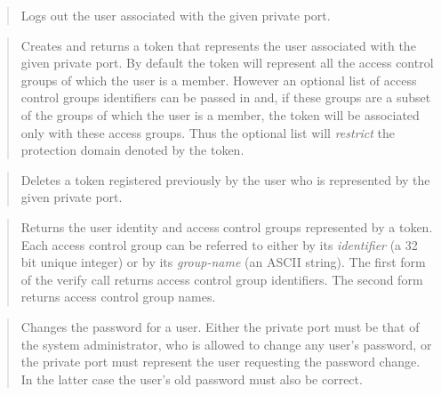 \begin{quotation} 

Logs out the user associated with the given private port.
\end{quotation}

\begin{quotation} 

Creates and returns a token that represents the user associated with the
given private port.  By default the token will represent all the access
control groups of which the user is a member.  However an optional list of
access control groups identifiers can be passed in and, if these groups are
a subset of the groups of which the user is a member, the token will be
associated only with these access groups.  Thus the optional list will {\em
restrict\/} the protection domain denoted by the token.
\end{quotation}

\begin{quotation} 

Deletes a token registered previously by the user who is represented by the
given private port.
\end{quotation}

\begin{quotation} 


Returns the user identity and access control groups represented by a token.
Each access control group can be referred to either by its {\em identifier\/}
(a 32 bit unique integer) or by its {\em group-name\/} (an ASCII string). The
first form of the verify call returns access control group identifiers.  The
second form returns access control group names.
\end{quotation}

\begin{quotation} 

Changes the password for a user.  Either the private port must be that of
the system administrator, who is allowed to change any user's password, or
the private port must represent the user requesting the password change.  In
the latter case the user's old password must also be correct.
\end{quotation}

